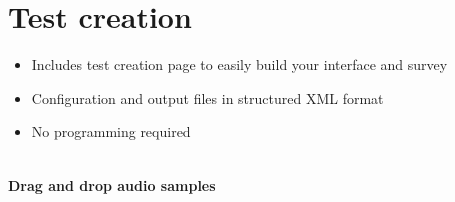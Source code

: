 \vspace{-0.8cm}
\section{Test creation} %

\begin{itemize}
	\item Includes test creation page to easily build your interface and survey%
	\item Configuration and output files in structured XML format
	\item No programming required
\end{itemize}

\begin{center}
\\ %
\small
\textbf{Drag and drop audio samples}
\end{center}